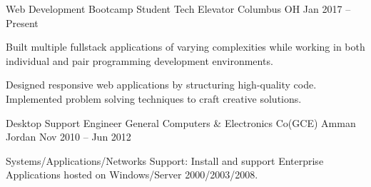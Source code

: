 \vspace{-3mm}
\begin{cventries}
    \vspace{-1mm}  \cventry
    {Web Development Bootcamp Student}
    {Tech Elevator}
    {Columbus OH}
    {Jan 2017 – Present}
    {
      \begin{cvitems}
        \item {Built multiple fullstack
applications of varying complexities while  
working in both individual and pair programming development environments.}
 \item {Designed responsive web applications by structuring high-quality
code. Implemented problem solving techniques to craft
creative solutions.}
        \end{cvitems}    \vspace{-3mm}  }
      \cventry
    {Desktop Support Engineer}
    {General Computers \& Electronics Co(GCE)}
    {Amman Jordan}
    {Nov 2010 – Jun 2012}
    {
      \begin{cvitems}
        \item {Systems/Applications/Networks Support: Install and support Enterprise Applications hosted on Windows/Server 2000/2003/2008.}
        \end{cvitems}} 
\end{cventries}
